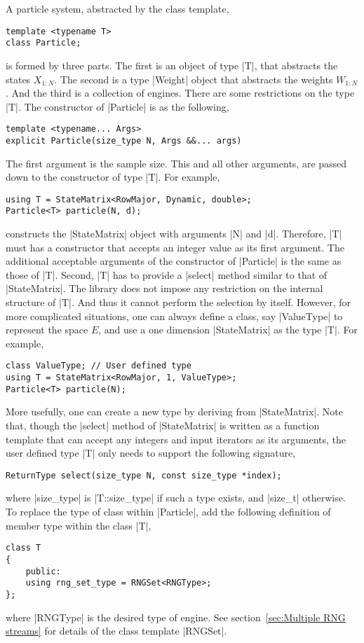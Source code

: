A particle system, abstracted by the class template,
\begin{verbatim}
template <typename T>
class Particle;
\end{verbatim}
is formed by three parts. The first is an object of type |T|, that abstracts
the states $X_{1:N}$. The second is a type |Weight| object that abstracts the
weights $W_{1:N}$. And the third is a collection of \rng engines. There are
some restrictions on the type |T|. The constructor of |Particle| is as the
following,
\begin{verbatim}
template <typename... Args>
explicit Particle(size_type N, Args &&... args)
\end{verbatim}
The first argument is the sample size. This and all other arguments, are passed
down to the constructor of type |T|. For example,
\begin{verbatim}
using T = StateMatrix<RowMajor, Dynamic, double>;
Particle<T> particle(N, d);
\end{verbatim}
constructs the |StateMatrix| object with arguments |N| and |d|. Therefore, |T|
must has a constructor that accepts an integer value as its first argument. The
additional acceptable arguments of the constructor of |Particle| is the same as
those of |T|. Second, |T| has to provide a |select| method similar to that of
|StateMatrix|. The library does not impose any restriction on the internal
structure of |T|. And thus it cannot perform the selection by itself. However,
for more complicated situations, one can always define a class, say |ValueType|
to represent the space $E$, and use a one dimension |StateMatrix| as the type
|T|. For example,
\begin{verbatim}
class ValueType; // User defined type
using T = StateMatrix<RowMajor, 1, ValueType>;
Particle<T> particle(N);
\end{verbatim}
More usefully, one can create a new type by deriving from |StateMatrix|. Note
that, though the |select| method of |StateMatrix| is written as a function
template that can accept any integers and input iterators as its arguments, the
user defined type |T| only needs to support the following signature,
\begin{verbatim}
ReturnType select(size_type N, const size_type *index);
\end{verbatim}
where |size_type| is |T::size_type| if such a type exists, and |size_t|
otherwise. To replace the type of \rng class within |Particle|, add the
following definition of member type within the class |T|,
\begin{verbatim}
class T
{
    public:
    using rng_set_type = RNGSet<RNGType>;
};
\end{verbatim}
where |RNGType| is the desired type of \rng engine. See
section~\ref{sec:Multiple RNG streams} for details of the class template
|RNGSet|.

